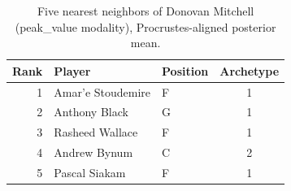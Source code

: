 \begin{table}[htbp]
  \centering\small
  \begin{tabular}{rllc}
    \toprule
    Rank & Player & Position & Archetype \\
    \midrule
    1 & Amar'e Stoudemire & F & 1 \\
    2 & Anthony Black & G & 1 \\
    3 & Rasheed Wallace & F & 1 \\
    4 & Andrew Bynum & C & 2 \\
    5 & Pascal Siakam & F & 1 \\
    \bottomrule
  \end{tabular}
  \caption{Five nearest neighbors of Donovan Mitchell (peak_value modality), Procrustes-aligned posterior mean.}
  \label{tab:Donovan_Mitchell_neighbors_peak_value}
\end{table}

